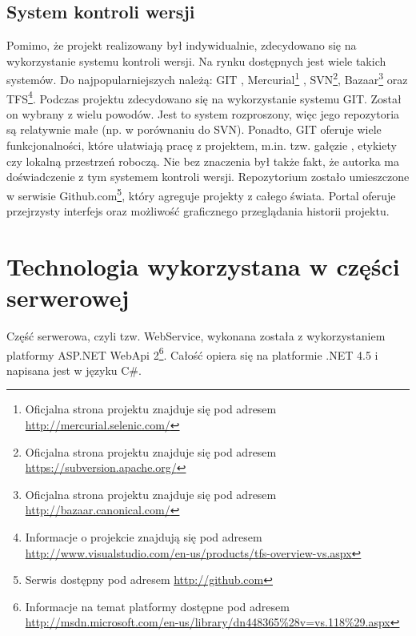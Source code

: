 \documentclass{book}
\begin{document}
			\subsection{System kontroli wersji}
			
			Pomimo, że projekt realizowany był indywidualnie, zdecydowano się na wykorzystanie systemu kontroli wersji. Na rynku dostępnych jest wiele takich systemów. Do najpopularniejszych należą: GIT \cite{id:GIT} %
			, Mercurial\footnote{Oficjalna strona projektu znajduje się pod adresem \url{http://mercurial.selenic.com/}} , SVN\footnote{Oficjalna strona projektu znajduje się pod adresem \url{https://subversion.apache.org/}}, Bazaar\footnote{Oficjalna strona projektu znajduje się pod adresem \url{http://bazaar.canonical.com/}} oraz TFS\footnote{Informacje o projekcie znajdują się pod adresem \url{http://www.visualstudio.com/en-us/products/tfs-overview-vs.aspx}}. 
			Podczas projektu zdecydowano się na wykorzystanie systemu GIT. Został on wybrany z wielu powodów. Jest to system rozproszony, więc jego repozytoria są relatywnie małe (np. w porównaniu do SVN). Ponadto, GIT oferuje wiele funkcjonalności, które ułatwiają pracę z projektem, m.in. tzw. gałęzie , etykiety czy lokalną przestrzeń roboczą. Nie bez znaczenia był także fakt, że autorka ma doświadczenie z tym systemem kontroli wersji.
			Repozytorium zostało umieszczone w serwisie Github.com\footnote{Serwis dostępny pod adresem \url{http://github.com}}, który agreguje projekty z całego świata. Portal oferuje przejrzysty interfejs oraz możliwość graficznego przeglądania historii projektu.
		
		\section{Technologia wykorzystana w części serwerowej}
		
		Część serwerowa,  czyli tzw. WebService, wykonana została z wykorzystaniem platformy ASP.NET WebApi 2\footnote{Informacje na temat platformy dostępne pod adresem \url{http://msdn.microsoft.com/en-us/library/dn448365\%28v=vs.118\%29.aspx}}. Całość opiera się na platformie .NET 4.5 i napisana jest w języku C\#.
		
\end{document}
